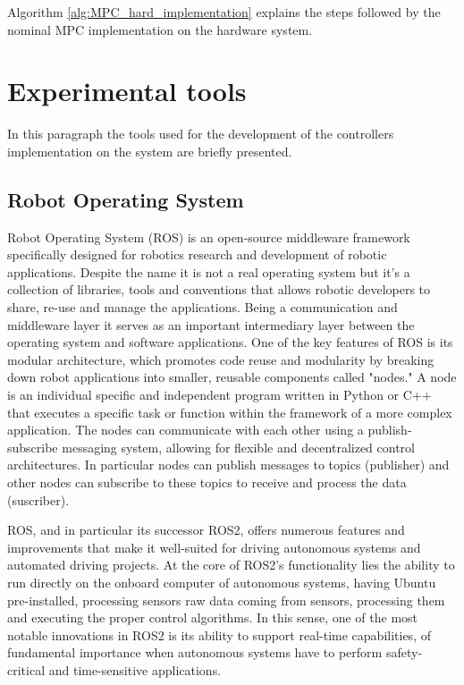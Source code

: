 \documentclass[a4paper,12pt,oneside]{book}
\begin{document}
Algorithm \ref{alg:MPC_hard_implementation} explains the steps followed by the nominal MPC implementation on the hardware system.

\section{Experimental tools}
In this paragraph the tools used for the development of the controllers implementation on the system are briefly presented.

\subsection*{Robot Operating System}
Robot Operating System (ROS) is an open-source middleware framework specifically designed for robotics research and development  \cite{ros} of robotic applications. 
Despite the name it is not a real operating system but it's a collection of libraries, tools and conventions that allows robotic developers to share, re-use and manage the applications.
Being a communication and middleware layer it serves as an important intermediary layer between the operating system and software applications.
One of the key features of ROS is its modular architecture, which promotes code reuse and modularity by breaking down robot applications into smaller, reusable components called "nodes." 
A node is an individual specific and independent program written in Python or C++ that executes a specific task or function within the framework of a more complex application.
The nodes can communicate with each other using a publish-subscribe messaging system, allowing for flexible and decentralized control architectures. 
In particular nodes can publish messages to topics (publisher) and other nodes can subscribe to these topics to receive and process the data (suscriber).


\bigskip
ROS, and in particular its successor ROS2, offers numerous features and improvements that make it well-suited for driving autonomous systems and automated driving projects.
At the core of ROS2's functionality lies the ability to run directly on the onboard computer of autonomous systems, having Ubuntu pre-installed, processing sensors raw data coming from sensors, processing them and executing the proper control algorithms.
In this sense, one of the most notable innovations in ROS2 is its ability to support real-time capabilities, of fundamental importance when autonomous systems have to perform safety-critical and time-sensitive applications.
\end{document}
